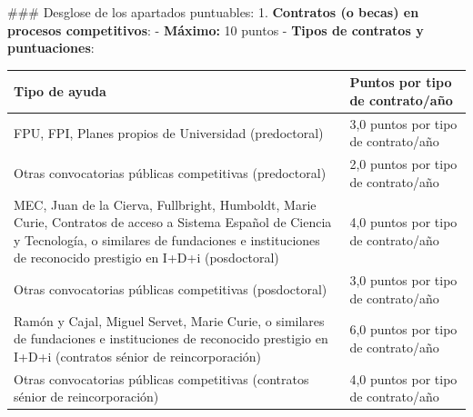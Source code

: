 \documentclass{article}
\begin{document}
\begin{itemize}
\begin{itemize}
                        \#\#\# Desglose de los apartados puntuables:
                        1. \textbf{Contratos (o becas) en procesos competitivos}:
                        - \textbf{Máximo:} 10 puntos
                        - \textbf{Tipos de contratos y puntuaciones}:
                        \vspace{0.4cm}
                        \begin{table}[h!]\centering\renewcommand{\arraystretch}{1.3}
                              \begin{tabular}{|p{}|p{}|}\hline
                                    Tipo de ayuda                                                                                                                                                                                                       & Puntos por tipo de contrato/año     \\\hline
                                    FPU, FPI, Planes propios de Universidad (predoctoral)                                                                                                                                                               & 3,0 puntos por tipo de contrato/año \\\hline
                                    Otras convocatorias públicas competitivas (predoctoral)                                                                                                                                                             & 2,0 puntos por tipo de contrato/año \\\hline
                                    MEC, Juan de la Cierva, Fullbright, Humboldt, Marie Curie, Contratos de acceso a Sistema Español de Ciencia y Tecnología, o similares de fundaciones e instituciones de reconocido prestigio en I+D+i (posdoctoral) & 4,0 puntos por tipo de contrato/año \\\hline
                                    Otras convocatorias públicas competitivas (posdoctoral)                                                                                                                                                             & 3,0 puntos por tipo de contrato/año \\\hline
                                    Ramón y Cajal, Miguel Servet, Marie Curie, o similares de fundaciones e instituciones de reconocido prestigio en I+D+i (contratos sénior de reincorporación)                                                        & 6,0 puntos por tipo de contrato/año \\\hline
                                    Otras convocatorias públicas competitivas (contratos sénior de reincorporación)                                                                                                                                     & 4,0 puntos por tipo de contrato/año \\\hline
                              \end{tabular}\end{table}
                        \vspace{0.4cm}


\end{itemize}
\end{itemize}
\end{document}
